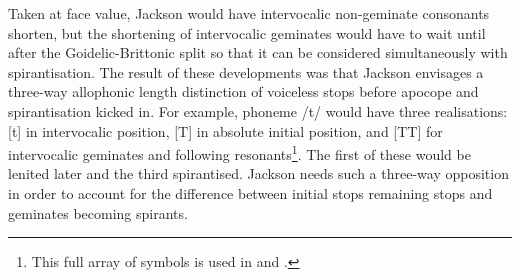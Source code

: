 Taken at face value, Jackson would have intervocalic non-geminate consonants shorten, but the shortening of intervocalic geminates would have to wait until after the Goidelic-Brittonic split so that it can be considered simultaneously with spirantisation. The result of these developments was that Jackson envisages a three-way allophonic length distinction of voiceless stops before apocope and spirantisation kicked in. For example, phoneme /t/ would have three realisations: [t] in intervocalic position, [T] in absolute initial position, and [TT] for intervocalic geminates and following resonants\footnote{This full array of symbols is used in \textcite{Jac_Gemination60} and \textcite{Jac_Historical67}.}. The first of these would be lenited later and the third spirantised. Jackson needs such a three-way opposition in order to account for the difference between initial stops remaining stops and geminates becoming spirants. 


